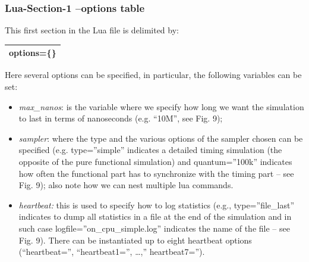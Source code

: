 \documentclass[a4paper]{article}
\begin{document}
\subsubsection[Lua{}-Section{}-1 {}--options
table]{\foreignlanguage{english}{\textrm{Lua-}}\textrm{S}\foreignlanguage{english}{\textrm{ection-}}\textrm{1}\foreignlanguage{english}{\textrm{
}}\foreignlanguage{english}{\textrm{{}--}}\foreignlanguage{english}{\textrm{o}}\textrm{ptions}\foreignlanguage{english}{\textrm{
table}}}
{
This first section in the Lua file is delimited by:}

\begin{flushleft}
\tablehead{}
\begin{supertabular}{|m{6.29346in}|}
\hline
{}\ttfamily options=\{\}\\\hline
\end{supertabular}
\end{flushleft}

\bigskip

{
Here several options can be specified, in particular, the following
variables can be set:}

\begin{itemize}
\item {
\textit{max\_nanos}: is the variable where we specify how long we want
the simulation to last in terms of nanoseconds (e.g.
{\textquotedblleft}10M{\textquotedblright}, see Fig. 9);}
\item {
\textit{sampler}: where the type and the various options of the sampler
chosen can be specified (e.g.
type={\textquotedblright}simple{\textquotedblright} indicates a
detailed timing simulation (the opposite of the pure functional
simulation) and quantum={\textquotedblright}100k{\textquotedblright}
indicates how often the functional part has to synchronize with the
timing part -- see Fig. 9); also note how we can nest multiple lua
commands.}
\item {
\textit{heartbeat: }this is used to specify how to log statistics (e.g.,
type={\textquotedblright}file\_last{\textquotedblright} indicates to
dump all statistics in a file at the end of the simulation and in such
case
logfile={\textquotedblright}on\_cpu\_simple.log{\textquotedblright}
indicates the name of the file -- see Fig. 9). There can be
instantiated up to eight heartbeat options
({\textquotedblleft}heartbeat={\textquotedblright},
{\textquotedblleft}heartbeat1={\textquotedblright},
{\dots},{\textquotedblright} heartbeat7={\textquotedblright}).}
\end{itemize}
\end{document}

